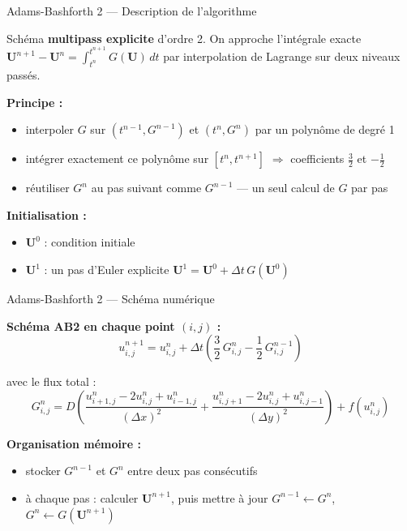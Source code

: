 \documentclass[10pt]{beamer}
\begin{document}
\begin{frame}{Adams-Bashforth 2 — Description de l'algorithme}

Schéma \textbf{multipass explicite} d'ordre 2. On approche l'intégrale exacte
$\mathbf{U}^{n+1} - \mathbf{U}^n = \int_{t^n}^{t^{n+1}} G(\mathbf{U})\,dt$
par interpolation de Lagrange sur deux niveaux passés.

\bigskip

\textbf{Principe :}
\begin{itemize}
  \item interpoler $G$ sur $(t^{n-1}, G^{n-1})$ et $(t^n, G^n)$
        par un polynôme de degré 1
  \item intégrer exactement ce polynôme sur $[t^n, t^{n+1}]$
        $\Rightarrow$ coefficients $\tfrac{3}{2}$ et $-\tfrac{1}{2}$
  \item réutiliser $G^n$ au pas suivant comme $G^{n-1}$ — un seul calcul de $G$ par pas
\end{itemize}

\bigskip

\textbf{Initialisation :}
\begin{itemize}
  \item $\mathbf{U}^0$ : condition initiale
  \item $\mathbf{U}^1$ : un pas d'Euler explicite
        $\mathbf{U}^1 = \mathbf{U}^0 + \Delta t\,G(\mathbf{U}^0)$
\end{itemize}

\end{frame}

\begin{frame}{Adams-Bashforth 2 — Schéma numérique}

\textbf{Schéma AB2 en chaque point $(i,j)$ :}
\begin{equation}
  \boxed{u_{i,j}^{n+1} = u_{i,j}^n
    + \Delta t\!\left(\frac{3}{2}\,G_{i,j}^n - \frac{1}{2}\,G_{i,j}^{n-1}\right)}
\end{equation}

avec le flux total :
\begin{equation}
  G_{i,j}^n = D\!\left(
    \frac{u_{i+1,j}^n - 2u_{i,j}^n + u_{i-1,j}^n}{(\Delta x)^2}
  + \frac{u_{i,j+1}^n - 2u_{i,j}^n + u_{i,j-1}^n}{(\Delta y)^2}
  \right) + f(u_{i,j}^n)
\end{equation}

\bigskip

\textbf{Organisation mémoire :}
\begin{itemize}
  \item stocker $G^{n-1}$ et $G^n$ entre deux pas consécutifs
  \item à chaque pas : calculer $\mathbf{U}^{n+1}$, puis mettre à jour
        $G^{n-1} \leftarrow G^n$, $G^n \leftarrow G(\mathbf{U}^{n+1})$
\end{itemize}

\end{frame}
\end{document}
